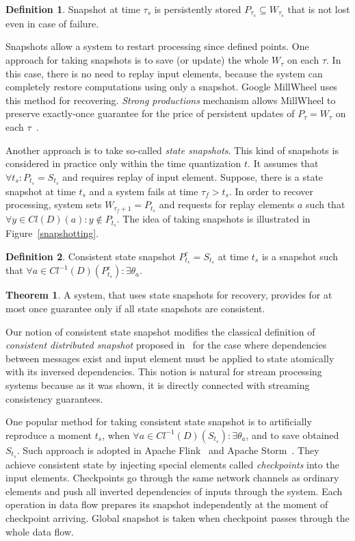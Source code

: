 \documentclass[sigconf]{acmart}
\theoremstyle{definition}
\newtheorem{definition}{Definition}
\newtheorem{theorem}{Theorem}
\begin{document}
\begin{definition}{Snapshot}
at time $\tau_s$ is persistently stored $P_{\tau_s}\subseteq{W_{\tau_s}}$ that is not lost even in case of failure.
\end{definition}

Snapshots allow a system to restart processing since defined points. One approach for taking snapshots is to save (or update) the whole $W_{\tau}$ on each $\tau$. In this case, there is no need to replay input elements, because the system can completely restore computations using only a snapshot. Google MillWheel uses this method for recovering. {\em Strong productions} mechanism allows MillWheel to preserve exactly-once guarantee for the price of persistent updates of $P_\tau=W_\tau$ on each $\tau$~\cite{Akidau:2013:MFS:2536222.2536229}.    

Another approach is to take so-called {\em state snapshots}. This kind of snapshots is considered in practice only within the time quantization $t$. It assumes that $\forall{t_s}:P_{t_s}=S_{t_s}$ and requires replay of input element. Suppose, there is a state snapshot at time $t_s$ and a system fails at time $\tau_f>t_s$. In order to recover processing, system sets $W_{\tau_f+1}=P_{t_s}$ and requests for replay elements $a$ such that $\forall{y\in{Cl(D)(a)}}:y\notin{P_{t_s}}$. The idea of taking snapshots is illustrated in Figure~\ref{snapshotting}.

\begin{definition}{Consistent state snapshot}
$P^{c}_{t_s}=S_{t_s}$ at time $t_s$ is a snapshot such that $\forall{a}\in{Cl^{-1}(D)(P^{c}_{t_s})}:\exists{\theta_a}$.
\end{definition}

\begin{theorem}
A system, that uses state snapshots for recovery, provides for at most once guarantee only if all state snapshots are consistent.  
\end{theorem}

Our notion of consistent state snapshot modifies the classical definition of {\em consistent distributed snapshot} proposed in~\cite{Chandy:1985:DSD:214451.214456} for the case where dependencies between messages exist and input element must be applied to state atomically with its inversed dependencies. This notion is natural for stream processing systems because as it was shown, it is directly connected with streaming consistency guarantees. 

One popular method for taking consistent state snapshot is to artificially reproduce a moment $t_s$, when $\forall{a}\in{Cl^{-1}(D)(S_{t_s})}:\exists{\theta_a}$, and to save obtained $S_{t_s}$. Such approach is adopted in Apache Flink~\cite{Carbone:2017:SMA:3137765.3137777} and Apache Storm~\cite{apache:storm:state}. They achieve consistent state by injecting special elements called {\em checkpoints} into the input elements. Checkpoints go through the same network channels as ordinary elements and push all inverted dependencies of inputs through the system. Each operation in data flow prepares its snapshot independently at the moment of checkpoint arriving. Global snapshot is taken when checkpoint passes through the whole data flow. 
\end{document}
